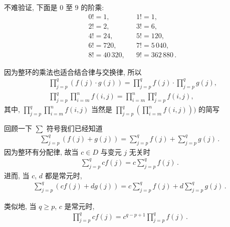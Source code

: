 \begin{example}
    不难验证, 下面是 $0$ 至 $9$ 的阶乘:
    \begin{align*}
         & 0! = 1,       &  & 1! = 1,               \\
         & 2! = 2,       &  & 3! = 6,               \\
         & 4! = 24,      &  & 5! = 120,             \\
         & 6! = 720,     &  & 7! = 5\,040,          \\
         & 8! = 40\,320, &  & 9! = 362\,880 \period
    \end{align*}
\end{example}

\begin{remark}
    因为整环的乘法也适合结合律与交换律, 所以
    \begin{align*}
         & \prod_{j=p}^{q} (f(j) \cdot g(j)) = \prod_{j=p}^{q} f(j) \cdot \prod_{j=p}^{q} g(j), \\
         & \prod_{j=p}^{q} \prod_{i=m}^{n} f(i,j) = \prod_{i=m}^{n} \prod_{j=p}^{q} f(i,j),
    \end{align*}
    其中, $\prod_{j=p}^{q} \prod_{i=m}^{n} f(i,j)$ 当然是 $\prod_{j=p}^{q} \left( \prod_{i=m}^{n} f(i,j) \right))$ 的简写\period
\end{remark}

\begin{example}
    回顾一下 $\sum$ 符号\period 我们已经知道
    \begin{align*}
        \sum_{j=p}^{q} (f(j) + g(j)) = \sum_{j=p}^{q} f(j) + \sum_{j=p}^{q} g(j) \period
    \end{align*}
    因为整环有分配律, 故当 $c \in D$ 与变元 $j$ 无关时
    \begin{align*}
        \sum_{j=p}^{q} cf(j) = c\sum_{j=p}^{q} f(j) \period
    \end{align*}
    进而, 当 $c$, $d$ 都是常元时,
    \begin{align*}
        \sum_{j=p}^{q} (cf(j) + dg(j)) = c\sum_{j=p}^{q} f(j) + d\sum_{j=p}^{q} g(j) \period
    \end{align*}
\end{example}

\begin{remark}
    类似地, 当 $q \geq p$, $c$ 是常元时,
    \begin{align*}
        \prod_{j=p}^{q} cf(j) = c^{q-p+1} \prod_{j=p}^{q} f(j) \period
    \end{align*}
\end{remark}

